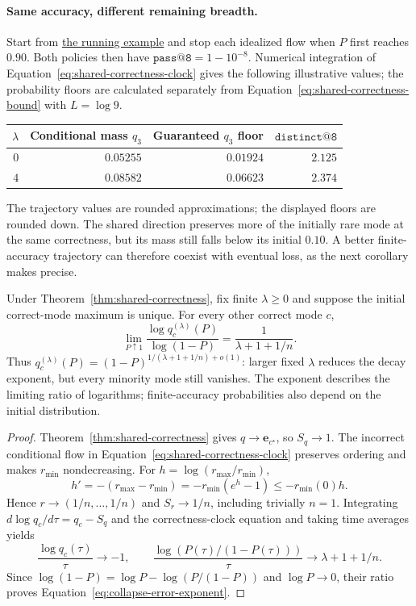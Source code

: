 \paragraph{Same accuracy, different remaining breadth.}
Start from \hyperref[ex:theory-running]{the running example} and stop each idealized flow when
$P$ first reaches $0.90$. Both policies then have
$\texttt{pass@8}=1-10^{-8}$. Numerical integration of
Equation~\eqref{eq:shared-correctness-clock} gives the following illustrative
values; the probability floors are calculated separately from
Equation~\eqref{eq:shared-correctness-bound} with $L=\log9$.
\begin{center}
\begin{tabular}{@{}rrrr@{}}
\toprule
$\lambda$ & Conditional mass $q_3$ & Guaranteed $q_3$ floor & $\texttt{distinct@8}$ \\
\midrule
$0$ & $0.05255$ & $0.01924$ & $2.125$ \\
$4$ & $0.08582$ & $0.06623$ & $2.374$ \\
\bottomrule
\end{tabular}
\end{center}
The trajectory values are rounded approximations; the displayed floors are
rounded down. The shared direction preserves more of the initially rare mode
at the same correctness, but its mass still falls below its initial $0.10$.
A better finite-accuracy trajectory can therefore coexist with eventual loss,
as the next corollary makes precise.

\begin{corollary}
\label{cor:collapse-error-rate}
Under Theorem~\ref{thm:shared-correctness}, fix finite $\lambda\ge0$
and suppose the initial correct-mode maximum is unique. For every other
correct mode $c$,
\begin{equation}
 \lim_{P\uparrow1}\frac{\log q_c^{(\lambda)}(P)}{\log(1-P)}
 =\frac{1}{\lambda+1+1/n}.
 \label{eq:collapse-error-exponent}
\end{equation}
Thus $q_c^{(\lambda)}(P)=(1-P)^{1/(\lambda+1+1/n)+o(1)}$:
larger fixed $\lambda$ reduces the decay exponent, but every minority mode
still vanishes. The exponent describes the limiting ratio of logarithms;
finite-accuracy probabilities also depend on the initial distribution.
\end{corollary}

\begin{proof}
Theorem~\ref{thm:shared-correctness} gives $q\to\mathbf e_{c^\star}$,
so $S_q\to1$. The incorrect conditional flow in
Equation~\eqref{eq:shared-correctness-clock} preserves ordering and makes
$r_{\min}$ nondecreasing. For $h=\log(r_{\max}/r_{\min})$,
\[
 h'=-(r_{\max}-r_{\min})
 =-r_{\min}(e^h-1)\le-r_{\min}(0)h.
\]
Hence $r\to(1/n,\ldots,1/n)$ and $S_r\to1/n$, including trivially $n=1$.
Integrating $d\log q_c/d\tau=q_c-S_q$ and the correctness-clock equation
and taking time averages yields
\[
 \frac{\log q_c(\tau)}{\tau}\to-1,
 \qquad
 \frac{\log(P(\tau)/(1-P(\tau)))}{\tau}
 \to\lambda+1+1/n.
\]
Since $\log(1-P)=\log P-\log(P/(1-P))$ and $\log P\to0$, their ratio proves
Equation~\eqref{eq:collapse-error-exponent}.
\end{proof}

